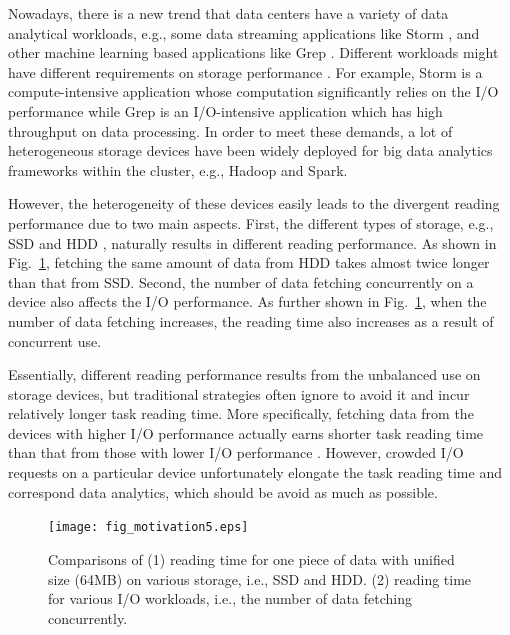 \documentclass[conference]{IEEEtran}
\begin{document}
Nowadays, there is a new trend that data centers have a variety of data analytical workloads, e.g., some data streaming applications like Storm
\cite{b40}, and other machine learning based applications like Grep \cite{b27}. Different workloads might have different requirements on storage performance \cite{b28} \cite{b29} \cite{b30} \cite{b31}. For example, Storm is a compute-intensive application whose computation significantly relies on the I/O performance while Grep is an I/O-intensive application which has high throughput on data processing. In order to meet these demands, a lot of heterogeneous storage devices \cite{b6} have been widely deployed for big data analytics frameworks within the cluster, e.g., Hadoop \cite{b14} and Spark\cite{b15}.

However, the heterogeneity of these devices easily leads to the divergent reading performance due to two main aspects. First, the different types of storage, e.g., SSD \cite{b32} and HDD \cite{b33}, naturally results in different reading performance. As shown in Fig.~\ref{Fig:motivation}, fetching the same amount of data from HDD takes almost twice longer than that from SSD. Second, the number of data fetching concurrently on a device also affects the I/O performance. As further shown in Fig.~\ref{Fig:motivation}, when the number of data fetching increases, the reading time also increases as a result of concurrent use.%

Essentially, different reading performance results from the unbalanced use on storage devices, but traditional strategies \cite{b2} \cite{b3} \cite{b4} \cite{b5} often ignore to avoid it  and incur relatively longer task reading time. More specifically, fetching data from the devices with higher I/O performance actually earns shorter task reading time than that from those with lower I/O performance \cite{b7}. However, crowded I/O requests on a particular device unfortunately elongate the task reading time and correspond data analytics, which should be avoid as much as possible. 

\begin{figure}[!t]
	\centering
	\texttt{[image: fig\_motivation5.eps]}
	\caption{Comparisons of (1) reading time for one piece of data with unified size (64MB) on various storage, i.e., SSD and HDD. (2) reading time for various I/O workloads, i.e., the number of data fetching concurrently.}
	\label{Fig:motivation}

\end{figure} 
\end{document}
